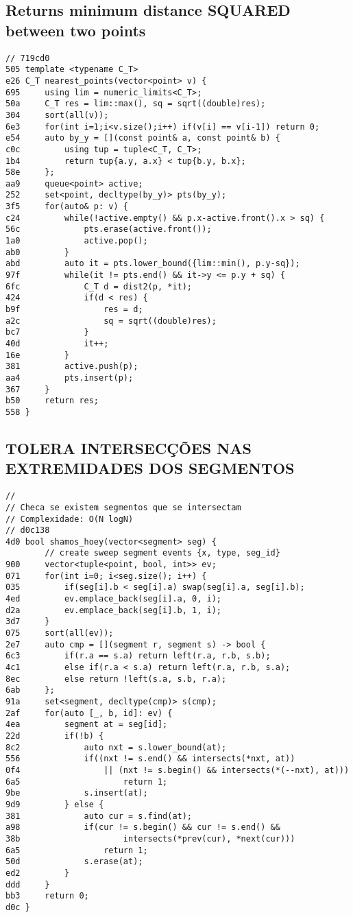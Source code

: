 \documentclass[11pt, a4paper, twoside]{article}
\begin{document}
\subsection{Returns minimum distance SQUARED between two points}
\begin{lstlisting}
// 719cd0
505 template <typename C_T>
e26 C_T nearest_points(vector<point> v) {
695 	using lim = numeric_limits<C_T>;
50a 	C_T res = lim::max(), sq = sqrt((double)res);
304 	sort(all(v));
6e3 	for(int i=1;i<v.size();i++) if(v[i] == v[i-1]) return 0;
e54 	auto by_y = [](const point& a, const point& b) {
c0c 		using tup = tuple<C_T, C_T>;
1b4 		return tup{a.y, a.x} < tup{b.y, b.x};
58e 	};
aa9 	queue<point> active;
252 	set<point, decltype(by_y)> pts(by_y);
3f5 	for(auto& p: v) {
c24 		while(!active.empty() && p.x-active.front().x > sq) {
56c 			pts.erase(active.front());
1a0 			active.pop();
ab0 		}
abd 		auto it = pts.lower_bound({lim::min(), p.y-sq});
97f 		while(it != pts.end() && it->y <= p.y + sq) {
6fc 			C_T d = dist2(p, *it);
424 			if(d < res) {
b9f 				res = d;
a2c 				sq = sqrt((double)res);
bc7 			}
40d 			it++;
16e 		}
381 		active.push(p);
aa4 		pts.insert(p);
367 	}
b50 	return res;
558 }
\end{lstlisting}

\subsection{TOLERA INTERSECÇÕES NAS EXTREMIDADES DOS SEGMENTOS}
\begin{lstlisting}
//
// Checa se existem segmentos que se intersectam
// Complexidade: O(N logN)
// d0c138
4d0 bool shamos_hoey(vector<segment> seg) {
    	// create sweep segment events {x, type, seg_id}
900 	vector<tuple<point, bool, int>> ev;
071 	for(int i=0; i<seg.size(); i++) {
035 		if(seg[i].b < seg[i].a) swap(seg[i].a, seg[i].b);
4ed 		ev.emplace_back(seg[i].a, 0, i);
d2a 		ev.emplace_back(seg[i].b, 1, i);
3d7 	}
075 	sort(all(ev));
2e7 	auto cmp = [](segment r, segment s) -> bool {
6c3 		if(r.a == s.a) return left(r.a, r.b, s.b);
4c1 		else if(r.a < s.a) return left(r.a, r.b, s.a);
8ec 		else return !left(s.a, s.b, r.a);
6ab 	};
91a 	set<segment, decltype(cmp)> s(cmp);
2af 	for(auto [_, b, id]: ev) {
4ea 		segment at = seg[id];
22d 		if(!b) {
8c2 			auto nxt = s.lower_bound(at);
556 			if((nxt != s.end() && intersects(*nxt, at))
0f4 				|| (nxt != s.begin() && intersects(*(--nxt), at)))
6a5 					return 1;
9be 			s.insert(at);
9d9 		} else {
381 			auto cur = s.find(at);
a98 			if(cur != s.begin() && cur != s.end() && 
38b 					intersects(*prev(cur), *next(cur))) 
6a5 				return 1;
50d 			s.erase(at);
ed2 		}
ddd 	}
bb3 	return 0;
d0c }
\end{lstlisting}
\end{document}
